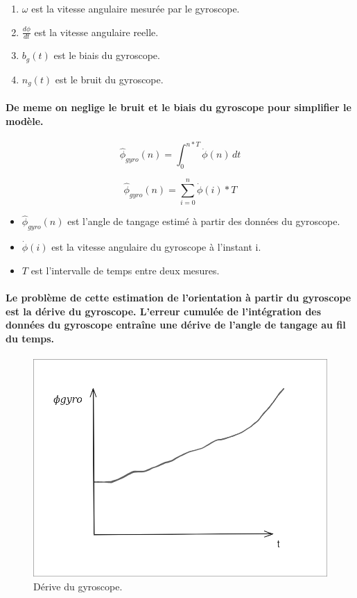 \begin{enumerate}
	\item $\omega$ est la vitesse angulaire mesurée par le gyroscope.
	\item $\frac{d\phi}{dt}$ est la vitesse angulaire reelle.
	\item $b_g(t)$ est le biais du gyroscope.
	\item $n_g(t)$ est le bruit du gyroscope.
\end{enumerate}

\paragraph{De meme on neglige le bruit et le biais du gyroscope pour simplifier le modèle.}

\begin{equation}
	\hat{\phi}_{gyro}(n) =  \int_{0}^{n*T} \dot{\phi}(n) \,dt
\end{equation}

\begin{equation}
	\hat{\phi}_{gyro}(n) =  \sum_{i=0}^{n} \dot{\phi}(i) * T
\end{equation}

\begin{itemize}
	\item $\hat{\phi}_{gyro}(n)$ est l'angle de tangage estimé à partir des données du gyroscope.
	\item $\dot{\phi}(i)$ est la vitesse angulaire du gyroscope à l'instant i.
	\item $T$ est l'intervalle de temps entre deux mesures.
\end{itemize}

\paragraph{Le problème de cette estimation de l'orientation à partir du gyroscope est la dérive du gyroscope. L'erreur cumulée de l'intégration des données du gyroscope entraîne une dérive de l'angle de tangage au fil du temps.}
\paragraph*{}
\begin{figure}[!htpb]
	\centering
	\includegraphics[width=0.7\linewidth]{Figures/drift.png}
	\caption[Dérive du gyroscope]{Dérive du gyroscope.}
\end{figure}


